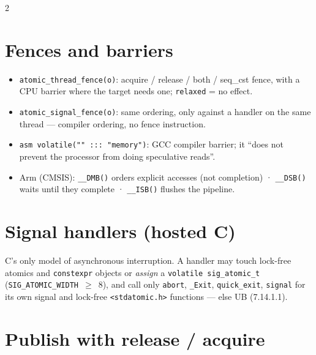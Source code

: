 \documentclass[8pt]{extarticle}
\newcommand\ct[1]{\texttt{#1}}
\begin{document}
\begin{multicols}{2}
\section{Fences and barriers}
\begin{itemize}
  \item \ct{atomic\_thread\_fence(o)}: acquire / release / both / seq\_cst fence, with a CPU
        barrier where the target needs one; \ct{relaxed} = no effect.
  \item \ct{atomic\_signal\_fence(o)}: same ordering, only against a handler on the same
        thread — compiler ordering, no fence instruction.
  \item \ct{asm volatile("" ::: "memory")}: GCC compiler barrier; it ``does not prevent the
        processor from doing speculative reads''.
  \item Arm (CMSIS): \ct{\_\_DMB()} orders explicit accesses (not completion) ·
        \ct{\_\_DSB()} waits until they complete · \ct{\_\_ISB()} flushes the pipeline.
\end{itemize}

\section{Signal handlers (hosted C)}
C's only model of asynchronous interruption. A handler may touch lock-free atomics and
\ct{constexpr} objects or \emph{assign} a \ct{volatile sig\_atomic\_t}
(\mbox{\ct{SIG\_ATOMIC\_WIDTH} $\ge$ 8}), and call only \ct{abort}, \ct{\_Exit}, \ct{quick\_exit},
\ct{signal} for its own signal and lock-free \ct{<stdatomic.h>} functions — else UB (7.14.1.1).

\columnbreak

\section{Publish with release / acquire}


\end{multicols}
\end{document}
